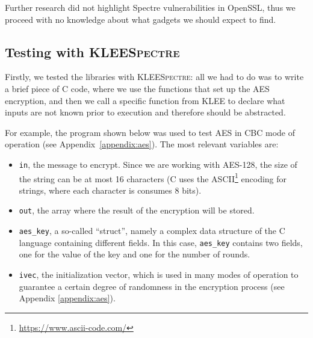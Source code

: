 \documentclass[target=mst,aauheader=aics]{thud}
\theoremstyle{definition}
\begin{document}
	Further research did not highlight Spectre vulnerabilities in OpenSSL, thus we proceed with no knowledge about what gadgets we should expect to find.
	
	\subsection{Testing with \textsc{KLEESpectre}}
	Firstly, we tested the libraries with \textsc{\textsc{\textsc{KLEESpectre}}}: all we had to do was to write a brief piece of C code, where we use the functions that set up the AES encryption, and then we call a specific function from \textsc{KLEE} to declare what inputs are not known prior to execution and therefore should be abstracted.
	
	For example, the program shown below was used to test AES in CBC mode of operation (see Appendix~\ref{appendix:aes}). The most relevant variables are:
	\begin{itemize}
		\item \texttt{in}, the message to encrypt. Since we are working with AES-128, the size of the string can be at most 16 characters (C uses the ASCII\footnote{\url{https://www.ascii-code.com/}} encoding for strings, where each character is consumes 8 bits).
		\item \texttt{out}, the array where the result of the encryption will be stored.
		\item \texttt{aes\_key}, a so-called ``struct'', namely a complex data structure of the C language containing different fields. In this case, \texttt{aes\_key} contains two fields, one for the value of the key and one for the number of rounds.
		\item \texttt{ivec}, the initialization vector, which is used in many modes of operation to guarantee a certain degree of randomness in the encryption process (see Appendix \ref{appendix:aes}).
	\end{itemize}
	
\end{document}
